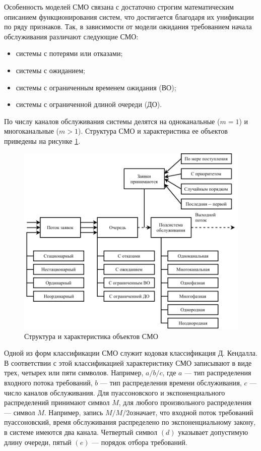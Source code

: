 Особенность моделей СМО связана с достаточно строгим математическим описанием функционирования систем, что достигается благодаря их унификации по ряду признаков. Так, в зависимости от модели ожидания требованием начала обслуживания различают следующие СМО:
\begin{itemize}
	\item системы с потерями или отказами;
	\item системы с ожиданием;
	\item системы с ограниченным временем ожидания (ВО);
\item системы с ограниченной длиной очереди (ДО).
\end{itemize}

По числу каналов обслуживания системы делятся на одноканальные ($m = 1$) и многоканальные ($m > 1$). Структура СМО и характеристика ее объектов приведены на рисунке \ref{fig:}.

\begin{figure}[!h]
	\centering
	\includegraphics{smo}
	\caption{Структура и характеристика объектов СМО}
	\label{fig:}
\end{figure}


Одной из форм классификации СМО служит кодовая классификация Д. Кендалла. В соответствии с этой классификацией характеристику СМО записывают в виде трех, четырех или пяти символов. Например, $ a/b/c $, где $ a $ --- тип распределения входного потока требований, $ b $ --- тип распределения времени обслуживания, $ c $ --- число каналов обслуживания. Для пуассоновского и экспоненциального распределений принимают символ $M$, для любого произвольного распределения --- символ $ M $. Например, запись $ M/M/2  $означает, что входной поток требований пуассоновский, время обслуживания распределено по экспоненциальному закону, в системе имеются два канала. Четвертый символ $ (d) $ указывает допустимую длину очереди, пятый $ (e) $ --- порядок отбора требований.

